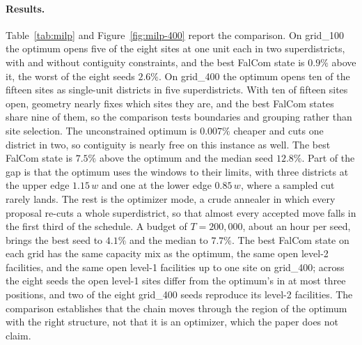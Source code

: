 \documentclass[preprint,12pt,authoryear]{elsarticle}
\theoremstyle{definition}
\begin{document}
\paragraph{Results.}
Table~\ref{tab:milp} and Figure~\ref{fig:milp-400} report the comparison. On grid\_100 the optimum opens five of the eight sites at one unit each in two superdistricts, with and without contiguity constraints, and the best FalCom state is $0.9\%$ above it, the worst of the eight seeds $2.6\%$. On grid\_400 the optimum opens ten of the fifteen sites as single-unit districts in five superdistricts. With ten of fifteen sites open, geometry nearly fixes which sites they are, and the best FalCom states share nine of them, so the comparison tests boundaries and grouping rather than site selection. The unconstrained optimum is $0.007\%$ cheaper and cuts one district in two, so contiguity is nearly free on this instance as well. The best FalCom state is $7.5\%$ above the optimum and the median seed $12.8\%$. Part of the gap is that the optimum uses the windows to their limits, with three districts at the upper edge $1.15\,w$ and one at the lower edge $0.85\,w$, where a sampled cut rarely lands. The rest is the optimizer mode, a crude annealer in which every proposal re-cuts a whole superdistrict, so that almost every accepted move falls in the first third of the schedule. A budget of $T = 200{,}000$, about an hour per seed, brings the best seed to $4.1\%$ and the median to $7.7\%$. The best FalCom state on each grid has the same capacity mix as the optimum, the same open level-2 facilities, and the same open level-1 facilities up to one site on grid\_400; across the eight seeds the open level-1 sites differ from the optimum's in at most three positions, and two of the eight grid\_400 seeds reproduce its level-2 facilities. The comparison establishes that the chain moves through the region of the optimum with the right structure, not that it is an optimizer, which the paper does not claim.
\end{document}

